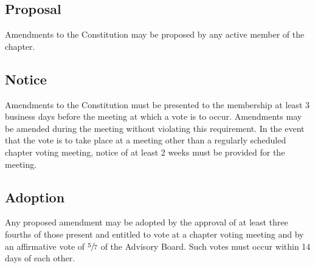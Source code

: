 \subsection{Proposal} \label{VI.1}
Amendments to the Constitution may be proposed by any active member of the chapter.

\subsection{Notice} \label{VI.2}
Amendments to the Constitution must be presented to the membership at least 3 business days before the meeting at which a vote is to occur.
Amendments may be amended during the meeting without violating this requirement.
In the event that the vote is to take place at a meeting other than a regularly scheduled chapter voting meeting, notice of at least 2 weeks must be provided for the meeting.

\subsection{Adoption} \label{VI.3}
Any proposed amendment may be adopted by the approval of at least three fourths of those present and entitled to vote at a chapter voting meeting and by an affirmative vote of $\sfrac{5}{7}$ of the Advisory Board.
Such votes must occur within 14 days of each other.